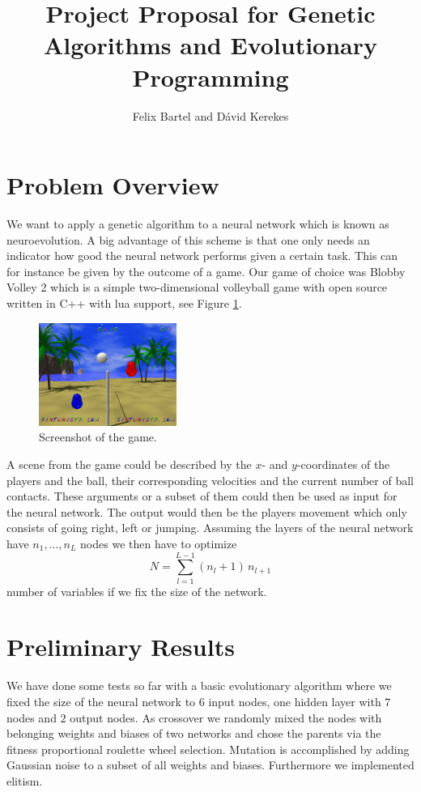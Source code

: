 \documentclass[11pt,a4paper]{scrartcl}
\date{}
\title{Project Proposal for Genetic Algorithms and Evolutionary Programming}
\author{Felix Bartel and D\'avid Kerekes}
\begin{document}
\maketitle

\section*{Problem Overview}

We want to apply a genetic algorithm to a neural network which is known as neuroevolution.
A big advantage of this scheme is that one only needs an indicator how good the neural network performs given a certain task.
This can for instance be given by the outcome of a game.
Our game of choice was Blobby Volley 2 which is a simple two-dimensional volleyball game with open source written in C++ with lua support, see Figure \ref{fig:screenshot}.

\begin{figure}[H]
\center
\includegraphics[width=0.4\textwidth]{img/screenshot.png}
\caption{Screenshot of the game.}
\label{fig:screenshot}
\end{figure}

A scene from the game could be described by the $x$- and $y$-coordinates of the players and the ball, their corresponding velocities and the current number of ball contacts.
These arguments or a subset of them could then be used as input for the neural network.
The output would then be the players movement which only consists of going right, left or jumping.
Assuming the layers of the neural network have $n_1,\dots,n_L$ nodes we then have to optimize \[N = \sum_{l=1}^{L-1} (n_l+1) \, n_{l+1}\] number of variables if we fix the size of the network.

\section*{Preliminary Results}

We have done some tests so far with a basic evolutionary algorithm \cite{github_repo} where we fixed the size of the neural network to $6$ input nodes, one hidden layer with $7$ nodes and $2$ output nodes.
As crossover we randomly mixed the nodes with belonging weights and biases of two networks and chose the parents via the fitness proportional roulette wheel selection.
Mutation is accomplished by adding Gaussian noise to a subset of all weights and biases.
Furthermore we implemented elitism.
\end{document}
